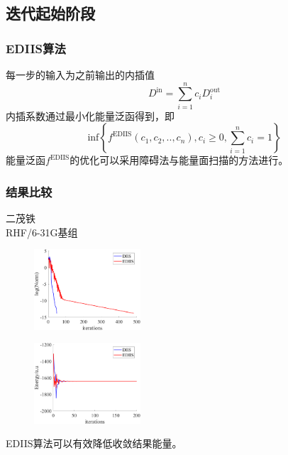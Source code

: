 \documentclass[10pt,aspectratio=43,mathserif,UTF8]{beamer}
\begin{document}
\subsection{迭代起始阶段}
\begin{frame}
	\frametitle{EDIIS算法}
	每一步的输入为之前输出的内插值
	\begin{equation}
	D^{\text{in}} = \sum_{i=1}^{n} c_i D_i^{\text{out}}
	\end{equation}
	内插系数通过最小化能量泛函得到，即
	\begin{equation}
	\text{inf} \left \{f^{\text{EDIIS}} (c_1,c_2,..,c_n ),c_i \ge 0, \sum_{i=1}^n c_i =1\right \}
	\end{equation}
	能量泛函$f^{\text{EDIIS}}$的优化可以采用障碍法与能量面扫描的方法进行。
\end{frame}

\begin{frame}
	\frametitle{结果比较}
	二茂铁\\
	RHF/6-31G基组
	\begin{figure}[ht!]
		\centering
		\begin{minipage}{0.4\linewidth}
			\centering
			\includegraphics[height=3cm]{figure/ferrocene/logNorm2.png}
			\label{fig:ferrocene:lognorm}
		\end{minipage}
		\begin{minipage}{0.4\linewidth}
			\centering
			\includegraphics[height=3cm]{figure/ferrocene/E2.png}
			\label{fig:ferrocene:E}
		\end{minipage}
		\label{fig:ferrocene}
	\end{figure}
	\centerline{EDIIS算法可以有效降低收敛结果能量。}
\end{frame}
\end{document}
